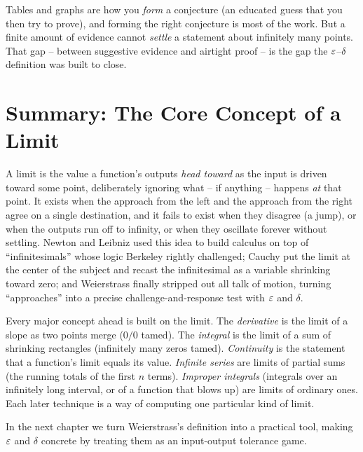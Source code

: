 \begin{focusbox}
Tables and graphs are how you \emph{form} a conjecture (an educated guess that you then try to
prove), and forming the right conjecture is most of the work. But a finite amount of
evidence cannot \emph{settle} a statement about infinitely many points. That gap -- between
suggestive evidence and airtight proof -- is the gap the $\varepsilon$--$\delta$ definition was
built to close.
\end{focusbox}

\section{Summary: The Core Concept of a Limit}

A limit is the value a function's outputs \emph{head toward} as the input is driven toward some
point, deliberately ignoring what -- if anything -- happens \emph{at} that point. It exists when
the approach from the left and the approach from the right agree on a single destination, and it
fails to exist when they disagree (a jump), or when the outputs run off to infinity, or when they
oscillate forever without settling. Newton and Leibniz used this idea to build calculus on top of ``infinitesimals'' whose logic Berkeley rightly challenged; Cauchy put the limit at the center of the subject and recast the infinitesimal as a variable shrinking toward zero; and Weierstrass finally stripped out all talk of motion, turning ``approaches'' into a precise challenge-and-response test with $\varepsilon$ and $\delta$.

\begin{connectionbox}
Every major concept ahead is built on the limit. The \emph{derivative} is the limit of a slope as two
points merge ($0/0$ tamed). The \emph{integral} is the limit of a sum of shrinking rectangles
(infinitely many zeros tamed). \emph{Continuity} is the statement that a function's limit equals
its value. \emph{Infinite series} are limits of partial sums (the running totals of the first
$n$ terms). \emph{Improper integrals} (integrals over an infinitely long interval, or of a
function that blows up) are limits of ordinary ones. Each later technique is a way of computing
one particular kind of limit.
\end{connectionbox}

In the next chapter we turn Weierstrass's definition into a practical tool, making
$\varepsilon$ and $\delta$ concrete by treating them as an input-output tolerance game.

